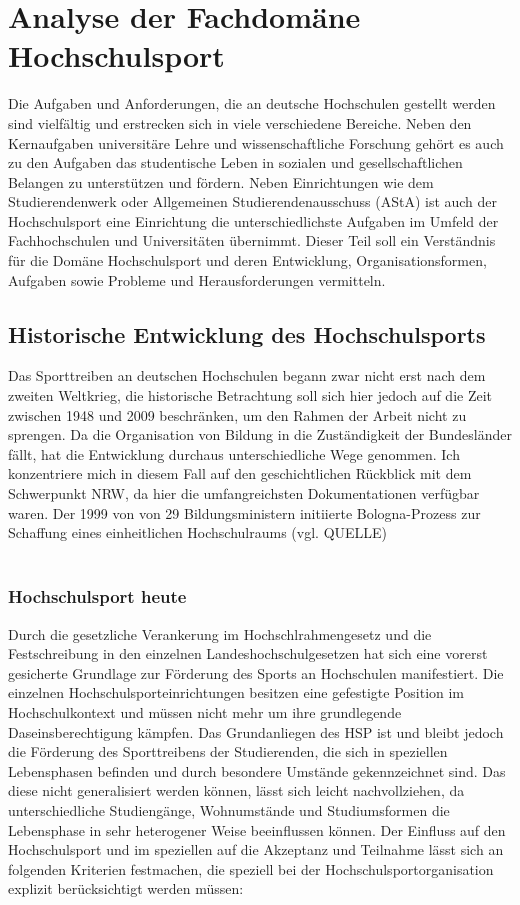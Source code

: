 \chapter{Analyse der Fachdomäne Hochschulsport} 
\label{ch:hochschulsport} 
Die Aufgaben und Anforderungen, die an deutsche Hochschulen gestellt werden sind vielfältig und erstrecken sich in viele verschiedene Bereiche. Neben den Kernaufgaben universitäre Lehre und wissenschaftliche Forschung gehört es auch zu den Aufgaben das studentische Leben in sozialen und gesellschaftlichen Belangen zu unterstützen und fördern. Neben Einrichtungen wie dem Studierendenwerk oder Allgemeinen Studierendenausschuss (AStA) ist auch der Hochschulsport eine Einrichtung die unterschiedlichste Aufgaben im Umfeld der Fachhochschulen und Universitäten übernimmt. Dieser Teil soll ein Verständnis für die Domäne Hochschulsport und deren Entwicklung, Organisationsformen, Aufgaben sowie Probleme und Herausforderungen vermitteln.

\section{Historische Entwicklung des Hochschulsports}
Das Sporttreiben an deutschen Hochschulen begann zwar nicht erst nach dem zweiten Weltkrieg, die historische Betrachtung soll sich hier jedoch auf die Zeit zwischen 1948 und 2009 beschränken, um den Rahmen der Arbeit nicht zu sprengen. Da die Organisation von Bildung in die Zuständigkeit der Bundesländer fällt, hat die Entwicklung durchaus unterschiedliche Wege genommen. Ich konzentriere mich in diesem Fall auf den geschichtlichen Rückblick mit dem Schwerpunkt NRW, da hier die umfangreichsten Dokumentationen verfügbar waren. 
Der 1999 von von 29 Bildungsministern initiierte Bologna-Prozess zur Schaffung eines einheitlichen Hochschulraums (vgl. QUELLE)
\\ \\

\subsection{Hochschulsport heute}
Durch die gesetzliche Verankerung im Hochschlrahmengesetz und die Festschreibung in den einzelnen Landeshochschulgesetzen hat sich eine vorerst gesicherte Grundlage zur Förderung des Sports an Hochschulen manifestiert. Die einzelnen Hochschulsporteinrichtungen besitzen eine gefestigte Position im Hochschulkontext und müssen nicht mehr um ihre grundlegende Daseinsberechtigung kämpfen. 
Das Grundanliegen des HSP ist und bleibt jedoch die Förderung des Sporttreibens der Studierenden, die sich in speziellen Lebensphasen befinden und durch besondere Umstände gekennzeichnet sind. Das diese nicht generalisiert werden können, lässt sich leicht nachvollziehen, da unterschiedliche Studiengänge, Wohnumstände und Studiumsformen die Lebensphase in sehr heterogener Weise beeinflussen können. Der Einfluss auf den Hochschulsport und im speziellen auf die Akzeptanz und Teilnahme lässt sich an folgenden Kriterien festmachen, die speziell bei der Hochschulsportorganisation explizit berücksichtigt werden müssen:

